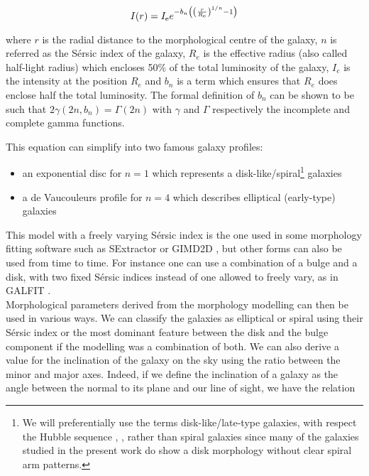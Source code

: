 \begin{equation}
    \label{eq:SersicProfile}
    I(r) = I_{\rm{e}} e^{ - b_n \left ( \left  ( \frac{r}{R_{\rm{e}}}  \right )^{1/n} - 1 \right ) }
\end{equation}

where $r$ is the radial distance to the morphological centre of the galaxy, $n$ is referred as the Sérsic index of the galaxy, $R_e$ is the effective radius (also called half-light radius) which encloses 50\% of the total luminosity of the galaxy, $I_e$ is the intensity at the position $R_e$ and $b_n$ is a term which ensures that $R_e$ does enclose half the total luminosity. The formal definition of $b_n$ can be shown to be such that $2 \gamma (2n, b_n) = \Gamma (2n)$ with $\gamma$ and $\Gamma$ respectively the incomplete and complete gamma functions.

This equation can simplify into two famous galaxy profiles:

\begin{itemize}
    \item an exponential disc for $n = 1$ which represents a disk-like/spiral\footnote{We will preferentially use the terms disk-like/late-type galaxies, with respect the Hubble sequence ,  , rather than spiral galaxies since many of the galaxies studied in the present work do show a disk morphology without clear spiral arm patterns.} galaxies
    \item a de Vaucouleurs profile for $n = 4$ which describes elliptical (early-type) galaxies
\end{itemize}

This model with a freely varying Sérsic index is the one used in some morphology fitting software such as SExtractor  or GIMD2D , but other forms can also be used from time to time. For instance one can use a combination of a bulge and a disk, with two fixed Sérsic indices instead of one allowed to freely vary, as in GALFIT . \\

Morphological parameters derived from the morphology modelling can then be used in various ways. We can classify the galaxies as elliptical or spiral using their Sérsic index or the most dominant feature between the disk and the bulge component if the modelling was a combination of both. We can also derive a value for the inclination of the galaxy on the sky  using the ratio between the minor and major axes. Indeed, if we define the inclination of a galaxy as the angle between the normal to its plane and our line of sight, we have the relation

